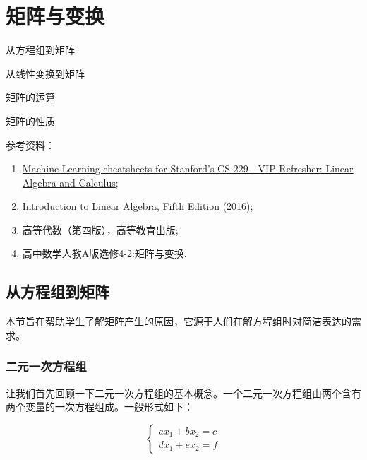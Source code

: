 \chapter{矩阵与变换}

\begin{introduction}
  \item 从方程组到矩阵
  \item 从线性变换到矩阵
  \item 矩阵的运算
  \item 矩阵的性质
\end{introduction}

参考资料：
\begin{enumerate}
    \item \href{https://github.com/afshinea/stanford-cs-229-machine-learning/blob/master/zh/refresher-algebra-calculus.pdf}{Machine Learning cheatsheets for Stanford's CS 229 - VIP Refresher: Linear Algebra and Calculus};
    \item \href{https://math.mit.edu/~gs/linearalgebra/ila5/indexila5.html}{Introduction to Linear Algebra, Fifth Edition (2016)};
    \item 高等代数（第四版），高等教育出版;
    \item 高中数学人教A版选修4-2:矩阵与变换.
\end{enumerate}

\section{从方程组到矩阵}
\label{sec:origin_of_matrix}

\begin{note}
本节旨在帮助学生了解矩阵产生的原因，它源于人们在解方程组时对简洁表达的需求。
\end{note}

\subsection{二元一次方程组}
\label{subsec:二元一次方程组}

让我们首先回顾一下二元一次方程组的基本概念。一个二元一次方程组由两个含有两个变量的一次方程组成。一般形式如下：

\begin{equation}
\left\{
\begin{array}{l}
ax_1 + bx_2 = c\\
dx_1 + ex_2 = f
\end{array}
\right.
\label{eq:二元一次方程组通式}
\end{equation}

